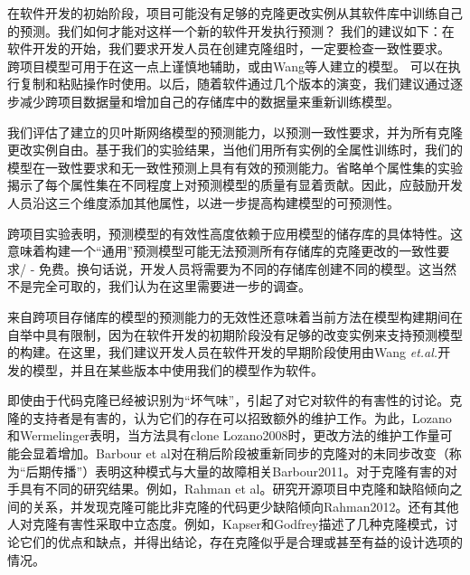 {{在软件开发的初始阶段，项目可能没有足够的克隆更改实例从其软件库中训练自己的预测。我们如何才能对这样一个新的软件开发执行预测？} {我们的建议如下：在软件开发的开始，我们要求开发人员在创建克隆组时，一定要检查一致性要求。
跨项目模型可用于在这一点上谨慎地辅助，或由Wang等人建立的模型。 \cite {Wang2014}可以在执行复制和粘贴操作时使用。以后，随着软件通过几个版本的演变，我们建议通过逐步减少跨项目数据量和增加自己的存储库中的数据量来重新训练模型。}

我们评估了建立的贝叶斯网络模型的预测能力，以预测一致性要求，并为所有克隆更改实例自由。基于我们的实验结果，当他们用所有实例的全属性训练时，我们的模型在一致性要求和无一致性预测上具有有效的预测能力。省略单个属性集的实验揭示了每个属性集在不同程度上对预测模型的质量有显着贡献。因此，应鼓励开发人员沿这三个维度添加其他属性，以进一步提高构建模型的可预测性。


跨项目实验表明，预测模型的有效性高度依赖于应用模型的储存库的具体特性。这意味着构建一个“通用”预测模型可能无法预测所有存储库的克隆更改的一致性要求/ - 免费。换句话说，开发人员将需要为不同的存储库创建不同的模型。这当然不是完全可取的，我们认为在这里需要进一步的调查。

来自跨项目存储库的模型的预测能力的无效性还意味着当前方法在模型构建期间在自举中具有限制，因为在软件开发的初期阶段没有足够的改变实例来支持预测模型的构建。在这里，我们建议开发人员在软件开发的早期阶段使用由Wang {\sl et.al.}开发的模型，并且在某些版本中使用我们的模型作为软件。

即使由于代码克隆已经被识别为“坏气味”，引起了对它对软件的有害性的讨论。克隆的支持者是有害的，认为它们的存在可以招致额外的维护工作。为此，Lozano和Wermelinger表明，当方法具有clone \cite{} {Lozano2008}时，更改方法的维护工作量可能会显着增加。Barbour et al对在稍后阶段被重新同步的克隆对的未同步改变（称为“后期传播”）表明这种模式与大量的故障相关\cite{}{Barbour2011}。对于克隆有害的对手具有不同的研究结果。例如，Rahman et al。研究开源项目中克隆和缺陷倾向之间的关系，并发现克隆可能比非克隆的代码更少缺陷倾向\cite{}{Rahman2012}。还有其他人对克隆有害性采取中立态度。例如，Kapser和Godfrey描述了几种克隆模式，讨论它们的优点和缺点，并得出结论，存在克隆似乎是合理或甚至有益的设计选项的情况。

}
